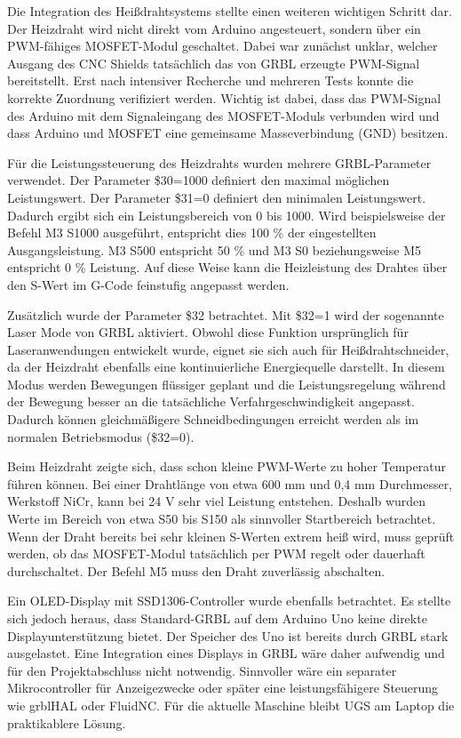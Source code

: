 Die Integration des Heißdrahtsystems stellte einen weiteren wichtigen Schritt dar. Der Heizdraht wird nicht direkt vom Arduino angesteuert, sondern über ein PWM-fähiges MOSFET-Modul geschaltet. Dabei war zunächst unklar, welcher Ausgang des CNC Shields tatsächlich das von GRBL erzeugte PWM-Signal bereitstellt. Erst nach intensiver Recherche und mehreren Tests konnte die korrekte Zuordnung verifiziert werden. Wichtig ist dabei, dass das PWM-Signal des Arduino mit dem Signaleingang des MOSFET-Moduls verbunden wird und dass Arduino und MOSFET eine gemeinsame Masseverbindung (GND) besitzen.

Für die Leistungssteuerung des Heizdrahts wurden mehrere GRBL-Parameter verwendet. Der Parameter \$30=1000 definiert den maximal möglichen Leistungswert. Der Parameter \$31=0 definiert den minimalen Leistungswert. Dadurch ergibt sich ein Leistungsbereich von 0 bis 1000. Wird beispielsweise der Befehl M3 S1000 ausgeführt, entspricht dies 100 \% der eingestellten Ausgangsleistung. M3 S500 entspricht 50 \% und M3 S0 beziehungsweise M5 entspricht 0 \% Leistung. Auf diese Weise kann die Heizleistung des Drahtes über den S-Wert im G-Code feinstufig angepasst werden.

Zusätzlich wurde der Parameter \$32 betrachtet. Mit \$32=1 wird der sogenannte Laser Mode von GRBL aktiviert. Obwohl diese Funktion ursprünglich für Laseranwendungen entwickelt wurde, eignet sie sich auch für Heißdrahtschneider, da der Heizdraht ebenfalls eine kontinuierliche Energiequelle darstellt. In diesem Modus werden Bewegungen flüssiger geplant und die Leistungsregelung während der Bewegung besser an die tatsächliche Verfahrgeschwindigkeit angepasst. Dadurch können gleichmäßigere Schneidbedingungen erreicht werden als im normalen Betriebsmodus (\$32=0).

Beim Heizdraht zeigte sich, dass schon kleine PWM-Werte zu hoher Temperatur führen können. Bei einer Drahtlänge von etwa 600 mm und 0,4 mm Durchmesser, Werkstoff NiCr, kann bei 24 V sehr viel Leistung entstehen. Deshalb wurden Werte im Bereich von etwa S50 bis S150 als sinnvoller Startbereich betrachtet. Wenn der Draht bereits bei sehr kleinen S-Werten extrem heiß wird, muss geprüft werden, ob das MOSFET-Modul tatsächlich per PWM regelt oder dauerhaft durchschaltet. Der Befehl M5 muss den Draht zuverlässig abschalten.

Ein OLED-Display mit SSD1306-Controller wurde ebenfalls betrachtet. Es stellte sich jedoch heraus, dass Standard-GRBL auf dem Arduino Uno keine direkte Displayunterstützung bietet. Der Speicher des Uno ist bereits durch GRBL stark ausgelastet. Eine Integration eines Displays in GRBL wäre daher aufwendig und für den Projektabschluss nicht notwendig. Sinnvoller wäre ein separater Mikrocontroller für Anzeigezwecke oder später eine leistungsfähigere Steuerung wie grblHAL oder FluidNC. Für die aktuelle Maschine bleibt UGS am Laptop die praktikablere Lösung.

